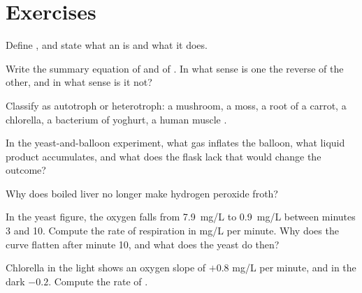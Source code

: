 \section{Exercises}

\begin{exercise}[$\star$]\label{exo:g10:cell-metabolism:1}
Define , and state what an  is and what it does.
\end{exercise}

\begin{exercise}[$\star$]\label{exo:g10:cell-metabolism:2}
Write the summary equation of  and of
. In what sense is one the reverse of the other, and in
what sense is it not?
\end{exercise}

\begin{exercise}[$\star$]\label{exo:g10:cell-metabolism:3}
Classify as autotroph or heterotroph: a mushroom, a moss, a root 
of a carrot, a chlorella, a bacterium of yoghurt, a human muscle .
\end{exercise}

\begin{exercise}[$\star$]\label{exo:g10:cell-metabolism:4}
In the yeast-and-balloon experiment, what gas inflates the balloon,
what liquid product accumulates, and what does the flask lack that
would change the outcome?
\end{exercise}

\begin{exercise}[$\star$]\label{exo:g10:cell-metabolism:5}
Why does boiled liver no longer make hydrogen peroxide froth?
\end{exercise}

\begin{exercise}[$\star\star$]\label{exo:g10:cell-metabolism:6}
In the yeast figure, the oxygen falls from \qty{7.9}{mg/L} to
\qty{0.9}{mg/L} between minutes 3 and 10. Compute the rate of
respiration in \unit{mg/L} per minute. Why does the curve flatten
after minute 10, and what does the yeast do then?
\end{exercise}

\begin{exercise}[$\star\star$]\label{exo:g10:cell-metabolism:7}
Chlorella in the light shows an oxygen slope of $+0.8$ \unit{mg/L}
per minute, and in the dark $-0.2$. Compute the rate of .
\end{exercise}

